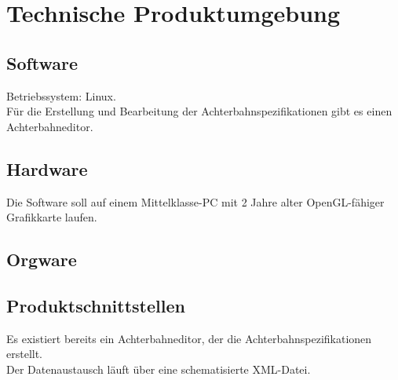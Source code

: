 
\chapter{Technische Produktumgebung}

\section{Software}
Betriebssystem: Linux.\\
Für die Erstellung und Bearbeitung der Achterbahnspezifikationen gibt es einen Achterbahneditor.\\


\section{Hardware}
Die Software soll auf einem Mittelklasse-PC mit 2 Jahre alter OpenGL-fähiger Grafikkarte laufen.


\section{Orgware}




\section{Produktschnittstellen}
Es existiert bereits ein Achterbahneditor, der die Achterbahnspezifikationen erstellt.\\
Der Datenaustausch läuft über eine schematisierte XML-Datei.
